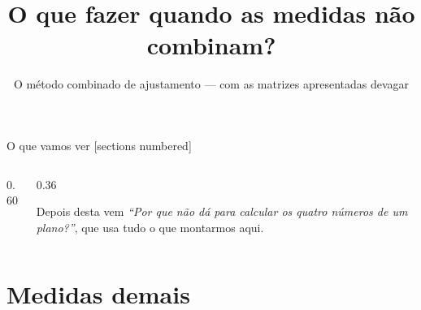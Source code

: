 \documentclass[aspectratio=169,11pt]{beamer}
\title{O que fazer quando as medidas não combinam?}
\subtitle{O método combinado de ajustamento --- com as matrizes apresentadas devagar}
\author{}
\institute{Simulador de Ajustamento de Planos}
\date{}
\begin{document}
\maketitle

\begin{frame}{O que vamos ver}
  [sections numbered]
  \begin{columns}[T]
    \begin{column}{0.60\textwidth}
      \tableofcontents
    \end{column}
    \begin{column}{0.36\textwidth}
      \begin{ideia}[title={Esta aula tem continuação}]
        \small Depois desta vem \emph{``Por que não dá para calcular os quatro números de um
        plano?''}, que usa tudo o que montarmos aqui.
      \end{ideia}
    \end{column}
  \end{columns}
\end{frame}

\section{Medidas demais}
\end{document}
